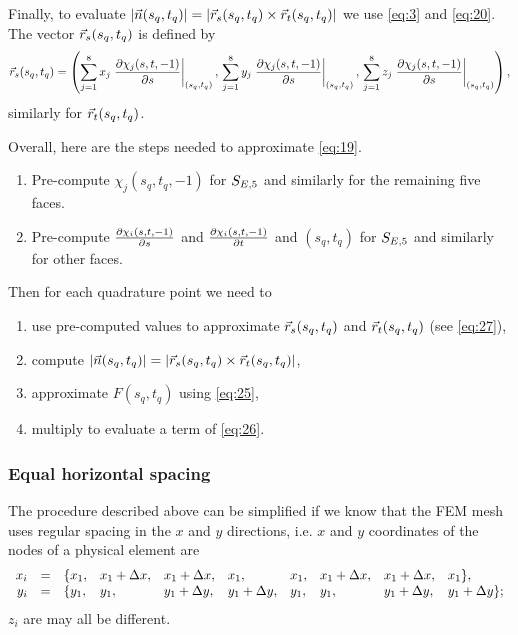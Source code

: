 \documentclass[11pt]{article}
\begin{document}
Finally, to evaluate $|\vec n(s_{q}, t_{q})| = | \vec r_{s}(s_{q}, t_{q}) \times
\vec r_{t}(s_{q}, t_{q}) |$ we use \eqref{eq:3} and \eqref{eq:20}.
The vector $\vec r_{s}(s_{q}, t_{q})$ is defined by
\begin{equation}
\label{eq:27}
\vec r_{s}(s_{q},t_{q}) = \left(
  \sum_{j=1}^{8} x_{j} \left.\frac{\partial \chi_{j}(s, t, -1)}{\partial s}\right|_{(s_{q}, t_{q})},\,
  \sum_{j=1}^{8} y_{j} \left.\frac{\partial \chi_{j}(s, t, -1)}{\partial s}\right|_{(s_{q}, t_{q})},\,
  \sum_{j=1}^{8} z_{j} \left.\frac{\partial \chi_{j}(s, t, -1)}{\partial s}\right|_{(s_{q}, t_{q})} \right),
\end{equation}
similarly for $\vec r_{t}(s_{q}, t_{q})$.

Overall, here are the steps needed to approximate \eqref{eq:19}.

\begin{enumerate}
\item Pre-compute $\chi_{j}(s_{q}, t_{q}, -1)$ for $S_{E,5}$ and similarly
for the remaining five faces.
\item Pre-compute $\frac{\partial \chi_{i}(s, t, -1)}{\partial s}$ and
$\frac{\partial \chi_{i}(s, t, -1)}{\partial t}$ and $(s_{q}, t_{q})$ for $S_{E,5}$ and similarly for
other faces.
\end{enumerate}

Then for each quadrature point we need to

\begin{enumerate}
\item use pre-computed values to approximate $\vec r_{s}(s_{q},t_{q})$ and
$\vec r_{t}(s_{q},t_{q})$ (see \eqref{eq:27}),
\item compute $|\vec n(s_{q}, t_{q})| = | \vec r_{s}(s_{q}, t_{q}) \times \vec r_{t}(s_{q}, t_{q}) |$,
\item approximate $F(s_{q}, t_{q})$ using \eqref{eq:25},
\item multiply to evaluate a term of \eqref{eq:26}.
\end{enumerate}

\subsubsection{Equal horizontal spacing}
\label{sec-4-1-1}

The procedure described above can be simplified if we know that the
FEM mesh uses regular spacing in the $x$ and $y$ directions, i.e.
$x$ and $y$ coordinates of the nodes of a physical element are
\begin{equation}
  \label{eq:28}
  \begin{array}{rcllllllll}
    x_{i} &=& \{ x_{1}, &x_{1} + \Delta x, &x_{1} + \Delta x, &x_{1}, &x_{1}, &x_{1} + \Delta x, &x_{1} + \Delta x, &x_{1} \},\\
    y_{i} &=& \{ y_{1}, &y_{1}, &y_{1} + \Delta y, &y_{1} + \Delta y, &y_{1}, &y_{1}, &y_{1} + \Delta y, &y_{1} + \Delta y \};\\
  \end{array}
\end{equation}
$z_{i}$ are may all be different.
\end{document}
